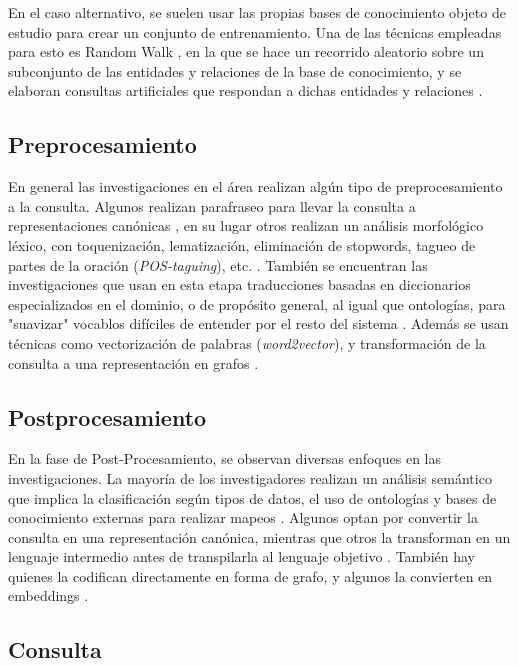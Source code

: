 En el caso alternativo, se suelen usar las propias bases de conocimiento objeto de
estudio para crear un conjunto de entrenamiento. Una de las técnicas empleadas para
esto es Random Walk \cite{randomwalk}, en la que se hace un recorrido aleatorio sobre un subconjunto de las entidades y relaciones de la base de conocimiento, y se elaboran consultas artificiales que respondan a dichas entidades y relaciones \cite{dominikopitz2022}.

\subsection{Preprocesamiento} \label{neurosym_approach_preprocessing}

En general las investigaciones en el área realizan algún tipo de preprocesamiento
a la consulta. Algunos realizan parafraseo para llevar la consulta a representaciones
canónicas \cite{canonical}, en su lugar otros realizan un análisis morfológico léxico, con toquenización, lematización, eliminación de stopwords, tagueo de partes de la oración (\textit{POS-taguing}), etc. \cite{postaguing}. También se encuentran las investigaciones que usan en esta etapa traducciones basadas en diccionarios especializados en el dominio, o de propósito general, al igual que ontologías, para "suavizar" vocablos difíciles de entender por el resto del sistema \cite{smoothhardwords}. Además se usan técnicas como vectorización de palabras (\textit{word2vector}), y transformación de la consulta a una representación en grafos \cite{word2vector}.

\subsection{Postprocesamiento} \label{neurosym_approach_postprocessing}

En la fase de Post-Procesamiento, se observan diversas enfoques en las investigaciones. La mayoría de los investigadores realizan un análisis semántico que implica la clasificación según tipos de datos, el uso de ontologías y bases de conocimiento externas para realizar mapeos \cite{postprocessing1} \cite{postprocessing2}. Algunos optan por convertir la consulta en una representación canónica, mientras que otros la transforman en un lenguaje intermedio antes de transpilarla al lenguaje objetivo \cite{postprocessing3}. También hay quienes la codifican directamente en forma de grafo, y algunos la convierten en embeddings \cite{postprocessing4}.

\subsection{Consulta} \label{neurosym_approach_query}

